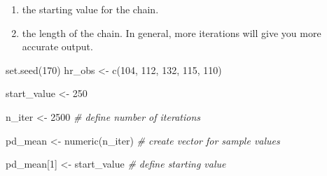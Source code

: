 \documentclass[
  12pt,
]{book}
\newenvironment{Shaded}{\begin{snugshade}}{\end{snugshade}}
\newcommand{\CommentTok}[1]{\textcolor[rgb]{0.56,0.35,0.01}{\textit{#1}}}
\newcommand{\DecValTok}[1]{\textcolor[rgb]{0.00,0.00,0.81}{#1}}
\newcommand{\FunctionTok}[1]{\textcolor[rgb]{0.00,0.00,0.00}{#1}}
\newcommand{\NormalTok}[1]{#1}
\newcommand{\OtherTok}[1]{\textcolor[rgb]{0.56,0.35,0.01}{#1}}
\providecommand{\tightlist}{%
  \setlength{\itemsep}{0pt}\setlength{\parskip}{0pt}}
\begin{document}
\begin{enumerate}
\def\labelenumi{\arabic{enumi}.}
\tightlist
\item
  the starting value for the chain.
\item
  the length of the chain. In general, more iterations will give you more accurate output.
\end{enumerate}

\begin{Shaded}
\begin{Highlighting}[]
\FunctionTok{set.seed}\NormalTok{(}\DecValTok{170}\NormalTok{)}
\NormalTok{hr\_obs }\OtherTok{\textless{}{-}} \FunctionTok{c}\NormalTok{(}\DecValTok{104}\NormalTok{, }\DecValTok{112}\NormalTok{, }\DecValTok{132}\NormalTok{, }\DecValTok{115}\NormalTok{, }\DecValTok{110}\NormalTok{)}

\NormalTok{start\_value }\OtherTok{\textless{}{-}} \DecValTok{250}

\NormalTok{n\_iter }\OtherTok{\textless{}{-}} \DecValTok{2500} \CommentTok{\# define number of iterations}

\NormalTok{pd\_mean }\OtherTok{\textless{}{-}} \FunctionTok{numeric}\NormalTok{(n\_iter) }\CommentTok{\# create vector for sample values}

\NormalTok{pd\_mean[}\DecValTok{1}\NormalTok{] }\OtherTok{\textless{}{-}}\NormalTok{ start\_value }\CommentTok{\# define starting value}


\end{Highlighting}
\end{Shaded}
\end{document}
